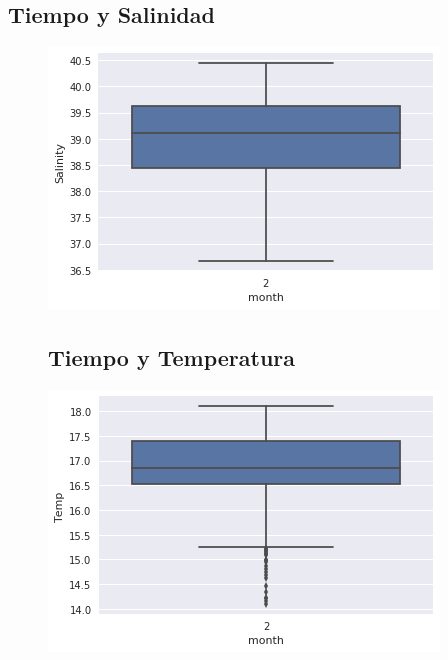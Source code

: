 \documentclass{article}
\begin{document}
\subsection{Tiempo y Salinidad}
\begin{figure}[ht]
  \includegraphics[width=\linewidth]{time-salinity.png}
\end{figure}
\begin{figure}
\subsection{Tiempo y Temperatura}
\includegraphics[width=\linewidth]{time-temp.png}
\end{figure}
\end{document}
